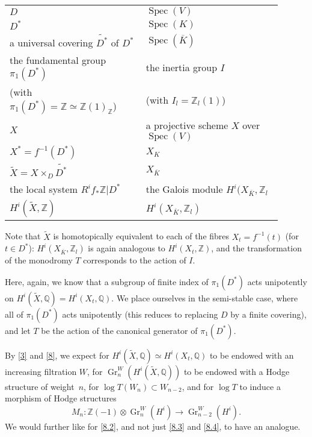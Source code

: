 \documentclass{article}
\theoremstyle{plain}
\theoremstyle{definition}
\newenvironment{env}[1]
    {\renewcommand\theinnercustomenv{#1}\innercustomenv}
    {\endinnercustomenv}
\newcommand{\ZZ}{\mathbb{Z}}
\newcommand{\QQ}{\mathbb{Q}}
\DeclareMathOperator{\Gr}{Gr}
\DeclareMathOperator{\Spec}{Spec}
\begin{document}
\begin{env}{9.1}
  \phantom{}
  \begin{tabular}{p{0.45\linewidth}|p{0.45\linewidth}}
    \toprule
    $D$
    & $\Spec(V)$
  \\$D^*$
    & $\Spec(K)$
  \\a universal covering $\widetilde{D^*}$ of $D^*$
    & $\Spec(\overline{K})$
  \\the fundamental group $\pi_1(D^*)$
    & the inertia group $I$
  \\(with $\pi_1(D^*)=\ZZ\simeq\ZZ(1)_\ZZ$)
    & (with $I_l=\ZZ_l(1)$)
  \\$X$
    & a projective scheme $X$ over $\Spec(V)$
  \\$X^*=f^{-1}(D^*)$
    & $X_K$
  \\$\widetilde{X}=X\times_D\widetilde{D^*}$
    & $X_{\overline{K}}$
  \\the local system $R^if_*\ZZ|D^*$
    & the Galois module $H^i(X_{\overline{K}},\ZZ_l$
  \\$H^i(\widetilde{X},\ZZ)$
    & $H^i(X_{\overline{K}},\ZZ_l)$
  \end{tabular}
\end{env}

Note that $\widetilde{X}$ is homotopically equivalent to each of the fibres $X_t=f^{-1}(t)$ (for $t\in D^*$): $H^i(X_{\overline{K}},\ZZ_l)$ is again analogous to $H^i(X_t,\ZZ)$, and the transformation of the monodromy $T$ corresponds to the action of $I$.

Here, again, we know that a subgroup of finite index of $\pi_1(D^*)$ acts unipotently on $H^i(\widetilde{X},\QQ)=H^i(X_t,\QQ)$.
We place ourselves in the semi-stable case, where all of $\pi_1(D^*)$ acts unipotently (this reduces to replacing $D$ by a finite covering), and let $T$ be the action of the canonical generator of $\pi_1(D^*)$.

By \cref{3} and \cref{8}, we expect for $H^i(\widetilde{X},\QQ)\simeq H^i(X_t,\QQ)$ to be endowed with an increasing filtration $W$, for $\Gr_n^W(H^i(\widetilde{X},\QQ))$ to be endowed with a Hodge structure of weight~$n$, for $\log T(W_n)\subset W_{n-2}$, and for $\log T$ to induce a morphism of Hodge structures
\[
  M_n\colon \ZZ(-1)\otimes\Gr_n^W(H^i) \to \Gr_{n-2}^W(H^i).
\]
We would further like for \cref{8.2}, and not just \cref{8.3} and \cref{8.4}, to have an analogue.




\nocite{*}
\end{document}
